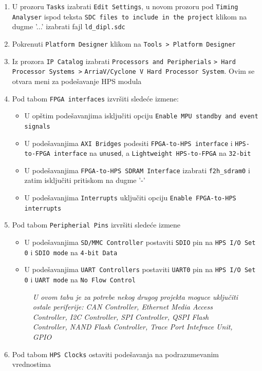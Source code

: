 \begin{enumerate}
\item U prozoru \texttt{Tasks} izabrati \texttt{Edit Settings}, u novom prozoru pod \texttt{Timing Analyser} ispod teksta \texttt{SDC files to include in the project} klikom na dugme '...' izabrati fajl \texttt{ld\_dipl.sdc}
\item  Pokrenuti \texttt{Platform Designer} klikom na \texttt{Tools > Platform Designer}
\item  Iz prozora \texttt{IP Catalog} izabrati \texttt{Processors and Peripherials} \texttt{> Hard Processor Systems >} \texttt{ArriaV/Cyclone V Hard Processor System}. Ovim se otvara meni za podešavanje HPS modula
\item  Pod tabom \texttt{FPGA interfaces} izvršiti sledeće izmene:
\begin{itemize}
\item	U opštim podešavanjima isključiti opciju \texttt{Enable MPU standby and event signals}
\item	U podešavanjima \texttt{AXI Bridges} podesiti \texttt{FPGA-to-HPS interface} i \texttt{HPS-to-FPGA interface} na \texttt{unused}, a \texttt{Lightweight HPS-to-FPGA} na \texttt{32-bit}
\item	U podešavanjima \texttt{FPGA-to-HPS SDRAM Interface} izabrati \texttt{f2h\_sdram0} i zatim isključiti pritiskom na dugme '-'
\item	U podešavanjima \texttt{Interrupts} uključiti opciju \texttt{Enable FPGA-to-HPS interrupts}
\end{itemize}
\item  Pod tabom \texttt{Peripherial Pins} izvršiti sledeće izmene
\begin{itemize}
\item	U podešavanjima \texttt{SD/MMC Controller} postaviti \texttt{SDIO} pin na \texttt{HPS I/O Set 0} i \texttt{SDIO mode} na \texttt{4-bit Data}
\item	U podešavanjima \texttt{UART Controllers} postaviti \texttt{UART0} pin na \texttt{HPS I/O Set 0} i \texttt{UART mode} na \texttt{No Flow Control}
\end{itemize}
	\begin{figure}[h!]
	\centering
	\textit{U ovom tabu je za potrebe nekog drugog projekta moguce uključiti ostale periferije: CAN Controller, Ethernet Media Access Controller, I2C Controller, SPI Controller, QSPI Flash Controller, NAND Flash Controller, Trace Port Intefrace Unit, GPIO}
	\end{figure}
\item  Pod tabom \texttt{HPS Clocks} ostaviti podešavanja na podrazumevanim vrednostima

\end{enumerate}
